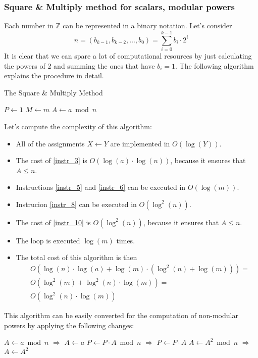 \subsubsection{Square \& Multiply method for scalars, modular powers}
Each number in $\mathbb{Z}$ can be represented in a binary notation. \newline
Let's consider
\[n = (b_{k-1}, b_{k-2}, \dots, b_{0}) = \sum_{i=0}^{k-1} b_{i} \cdot 2^{i}\]
It is clear that we can spare a lot of computational resources by just calculating the powers of 2 and summing the ones that have $b_{i} = 1$. The following algorithm explains the procedure in detail.
\begin{algorithm}
\caption{The Square \& Multiply Method}\label{alg:SquareMultiply}
$P \gets 1$\;\label{instr_1}
$M \gets m$\;
$A \gets a \bmod n$\;\label{instr_3}
\end{algorithm}
Let's compute the complexity of this algorithm:
\begin{itemize}
    \item All of the assignments $X \gets Y$ are implemented in $O(\operatorname{log}(Y))$.
    \item The cost of \ref{instr_3} is $O(\operatorname{log}(a) \cdot \operatorname{log}(n))$, because it ensures that $A \leq n$.
    \item Instructions \ref{instr_5} and \ref{instr_6} can be executed in $O(\operatorname{log}(m))$.
    \item Instrucion \ref{instr_8} can be executed in $O(\operatorname{log}^{2}(n))$.
    \item The cost of \ref{instr_10} is $O(\operatorname{log}^{2}(n))$, because it ensures that $A \leq n$.
    \item The loop is executed $\operatorname{log}(m)$ times.
    \item The total cost of this algorithm is then
    \begin{align*}
        &O(\operatorname{log}(n) \cdot \operatorname{log}(a) + \operatorname{log}(m) \cdot (\operatorname{log}^{2}(n) + \operatorname{log}(m))) =\\
        &O(\operatorname{log}^{2}(m) + \operatorname{log}^{2}(n) \cdot \operatorname{log}(m)) =\\
        &O(\operatorname{log}^{2}(n) \cdot \operatorname{log}(m))
    \end{align*}
\end{itemize}
This algorithm can be easily converted for the computation of non-modular powers by applying the following changes:
\begin{algorithm}
    $A \gets a \bmod n$ $\Longrightarrow$ $A \gets a$\;\label{instr_3a}
    $P \gets P \cdot A \bmod n$ $\Longrightarrow$ $P \gets P \cdot A$\;\label{instr_8a}
    $A \gets A^{2} \bmod n$ $\Longrightarrow$ $A \gets A^{2}$\;\label{instr_10a}
\end{algorithm}

